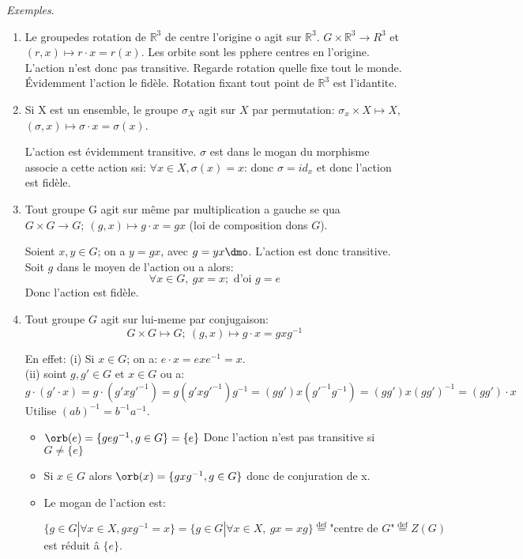 \emph{Exemples}.
\begin{enumerate}
	\item Le groupedes rotation de $\mathbb{R}^3$ de centre l'origine o agit sur $\mathbb{R}^3$. $G\times\mathbb{R}^3\rightarrow{R}^3$ et $(r, x)\mapsto r\cdot x=r(x).$
	Les orbite sont les pphere centres en l'origine. L'action n'est donc pas transitive. Regarde rotation quelle fixe tout le monde. Évidemment l'action le fidèle. Rotation fixant tout point de $\mathbb{R}^3$ est l'idantite.
	\item Si X est un ensemble, le groupe $\sigma_X$ agit sur $X$ par permutation:
	$\sigma_x \times X\mapsto X$, $(\sigma, x)\mapsto \sigma\cdot x=\sigma(x)$.
	
	L'action est évidemment transitive. $\sigma$ est dans le mogan du morphisme associe a cette action ssi: $\forall x\in X, \sigma(x)=x$: donc $\sigma =id_x$ et donc l'action est fidèle.
	\item Tout groupe G agit sur même par multiplication a gauche se qua $G\times G \rightarrow G;\ (g,x)\mapsto g\cdot x=gx$ (loi de composition dons $G$).
	
	Soient $x, y\in G$; on a $y=gx$, avec $g=yx\dmo$. L'action est donc transitive.
	Soit $g$ dans le moyen de l'action ou a alors:
	$$\forall x\in G,\ gx=x; \mbox{ d'oi } g=e$$
	Donc l'action est fidèle.
	\item Tout groupe $G$ agit sur lui-meme par conjugaison:
	$$G\times G\mapsto G;\ (g,x)\mapsto g\cdot x=gxg^{-1}$$
	
	En effet: (i) Si $x\in G$; on a: $e\cdot x = exe^{-1} = x$.\\
	(ii)  soint $g, g'\in G$ et $x\in G$ ou a:
	$$g\cdot (g'\cdot x)=g\cdot (g'xg'^{-1})=g(g'xg'^{-1})g^{-1}=(gg')x(g'^{-1}g^{-1})=(gg')x(gg')^{-1}=(gg')\cdot x$$
	Utilise $(ab)^{-1}=b^{-1}a^{-1}$.
	\begin{itemize} 
	\item $\orb(e)=\{geg^{-1}, g\in G\}=\{e\}$ Donc l'action n'est pas transitive si $G\neq\{e\}$ \\%
	\item Si $x\in G$ alors $\orb(x)=\{gxg^{-1}, g\in G\}$ donc de conjuration de x.\\
	\item Le mogan de l'action est:	

	$$\{g\in G | \forall x\in X, gxg^{-1} = x\} = \{g\in G | \forall x \in X,\ gx=xg\}\overset{\text{def}}{=}\text{"centre de $G$"}\overset{\text{def}}{=} Z(G)$$
	est réduit â $\{e\}$.
	\end{itemize}
\end{enumerate}

